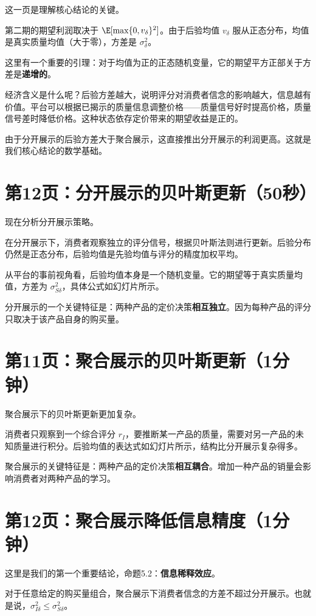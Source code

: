 \documentclass[12pt,a4paper]{article}
\begin{document}
这一页是理解核心结论的关键。

第二期的期望利润取决于 $\E[\max\{0, v_\delta\}^2]$。由于后验均值 $v_\delta$ 服从正态分布，均值是真实质量均值（大于零），方差是 $\sigma^2_\delta$。

这里有一个重要的引理：对于均值为正的正态随机变量，它的期望平方正部关于方差是\textbf{递增的}。

经济含义是什么呢？后验方差越大，说明评分对消费者信念的影响越大，信息越有价值。平台可以根据已揭示的质量信息调整价格——质量信号好时提高价格，质量信号差时降低价格。这种状态依存定价带来的期望收益是正的。

由于分开展示的后验方差大于聚合展示，这直接推出分开展示的利润更高。这就是我们核心结论的数学基础。

\section*{第12页：分开展示的贝叶斯更新（50秒）}

现在分析分开展示策略。

在分开展示下，消费者观察独立的评分信号，根据贝叶斯法则进行更新。后验分布仍然是正态分布，后验均值是先验均值与评分的精度加权平均。

从平台的事前视角看，后验均值本身是一个随机变量。它的期望等于真实质量均值，方差为 $\sigma_{S\delta}^2$，具体公式如幻灯片所示。

分开展示的一个关键特征是：两种产品的定价决策\textbf{相互独立}。因为每种产品的评分只取决于该产品自身的购买量。

\section*{第11页：聚合展示的贝叶斯更新（1分钟）}

聚合展示下的贝叶斯更新更加复杂。

消费者只观察到一个综合评分 $r_I$，要推断某一产品的质量，需要对另一产品的未知质量进行积分。后验均值的表达式如幻灯片所示，结构比分开展示复杂得多。

聚合展示的关键特征是：两种产品的定价决策\textbf{相互耦合}。增加一种产品的销量会影响消费者对两种产品的学习。

\section*{第12页：聚合展示降低信息精度（1分钟）}

这里是我们的第一个重要结论，命题5.2：\textbf{信息稀释效应}。

对于任意给定的购买量组合，聚合展示下消费者信念的方差不超过分开展示。也就是说，$\sigma_{I\delta}^2 \leq \sigma_{S\delta}^2$。
\end{document}
